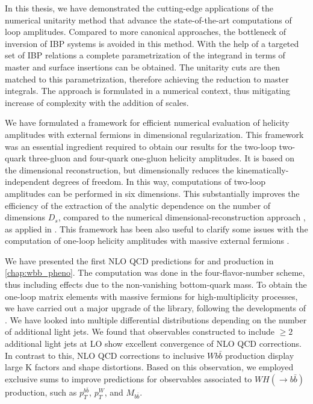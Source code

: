 In this thesis, we have demonstrated the cutting-edge applications of the numerical unitarity method \cite{Abreu:2017hqn,Abreu:2017idw,Abreu:2017xsl,Ita:2015tya,Ellis:2008ir,Ellis:2007br,Giele:2008ve}
that advance the state-of-the-art computations of loop amplitudes.
Compared to more canonical approaches, the bottleneck of inversion of IBP systems is avoided in this method.
With the help of a targeted set of IBP relations \citep{Gluza:2010ws,Abreu:2017hqn}
a complete parametrization of the integrand in terms of master and surface insertions can be obtained.
The unitarity cuts are then matched to this parametrization, therefore achieving the reduction to master integrals.
The approach is formulated in a numerical context, thus mitigating increase of complexity with the addition of scales.


We have formulated a framework for efficient numerical evaluation of helicity amplitudes with external fermions in dimensional regularization.
This framework was an essential ingredient required to obtain our results for the two-loop 
two-quark three-gluon and four-quark one-gluon helicity amplitudes.
It is based on the dimensional reconstruction, but dimensionally
reduces the kinematically-independent degrees of freedom.
In this way, computations of two-loop amplitudes can be performed in six dimensions.
This substantially improves the efficiency of the extraction of the analytic dependence on the
number of dimensions $D_s$, compared to the numerical dimensional-reconstruction approach \cite{Giele:2008ve,Ellis:2008ir, Boughezal:2011br}, as applied
in \cite{Abreu:2017xsl,Abreu:2017hqn,Badger:2018gip,Abreu:2018jgq}.
This framework has been also useful to clarify some issues with the computation of one-loop helicity amplitudes
with massive external fermions \cite{Anger:2018ove}.

We have presented the first NLO QCD predictions for \Wbbjj{} and \Wbbjjj{} production in \cref{chap:wbb_pheno}.
The computation was done in the four-flavor-number scheme, thus including effects due to the non-vanishing bottom-quark mass.
To obtain the one-loop matrix elements with massive fermions for high-multiplicity processes,
we have carried out a major upgrade of the \BlackHat{} library, following the developments of \cite{Ellis:2008ir}.
We have looked into multiple differential distributions depending on the number of additional light jets.
We found that observables constructed to include $\geq2$ additional light jets at LO
show excellent convergence of NLO QCD corrections.
In contrast to this, NLO QCD corrections to inclusive $Wb\bar{b}$ production display large K factors and shape distortions.
Based on this observation, we employed exclusive sums to improve predictions for observables associated to $WH(\rightarrow b{\bar b})$
production, such as $p_T^{b\bar b}$, $p_T^W$, and $M_{b\bar b}$.


